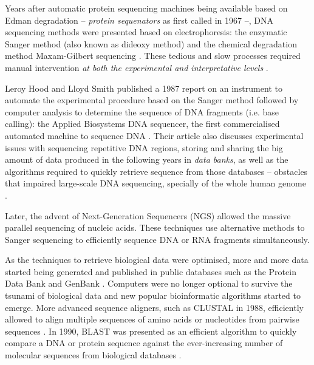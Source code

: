 

Years after automatic protein sequencing machines being available based on Edman degradation -- \emph{protein sequenators} as first called in 1967 \cite{edman:1967tc} --, DNA sequencing methods were presented based on electrophoresis: the enzymatic Sanger method (also known as dideoxy method) \cite{sanger:1977vp} and the chemical degradation method Maxam-Gilbert sequencing \cite{maxam:1977vy}. These tedious and slow processes required manual intervention \emph{at both the experimental and interpretative levels} \cite{hood:1987va}.

Leroy Hood and Lloyd Smith published a 1987 report on an instrument to automate the experimental procedure based on the Sanger method followed by computer analysis to determine the sequence of DNA fragments (i.e. base calling): the Applied Biosystems DNA sequencer, the first commercialised automated machine to sequence DNA \cite{hood:1987va}. Their article also discusses experimental issues with sequencing repetitive DNA regions, storing and sharing the big amount of data produced in the following years in \emph{data banks}, as well as the algorithms required to quickly retrieve sequence from those databases -- obstacles that impaired large-scale DNA sequencing, specially of the whole human genome \cite{hood:1987va}.

Later, the advent of Next-Generation Sequencers (NGS) allowed the massive parallel sequencing of nucleic acids. These techniques use alternative methods to Sanger sequencing to efficiently sequence DNA or RNA fragments simultaneously.

As the techniques to retrieve biological data were optimised, more and more data started being generated and published in public databases such as the Protein Data Bank \cite{protein-data-bank:1971tm} and GenBank \cite{burks:1985ts}. Computers were no longer optional to survive the tsunami of biological data and new popular bioinformatic algorithms started to emerge. More advanced sequence aligners, such as CLUSTAL in 1988, efficiently allowed to align multiple sequences of amino acids or nucleotides from pairwise sequences \cite{higgins:1988ul}. In 1990, BLAST was presented as an efficient algorithm to quickly compare a DNA or protein sequence against the ever-increasing number of molecular sequences from biological databases \cite{altschul:1990vt}.

